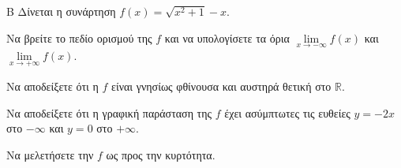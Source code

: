 \begin{thema}{Β}
Δίνεται η συνάρτηση $f(x) = \sqrt{x^2+1} - x$.
\begin{erwthma}
\item Να βρείτε το πεδίο ορισμού της $f$ και να υπολογίσετε τα όρια $\lim\limits_{x \to -\infty} f(x)$ και $\lim\limits_{x \to +\infty} f(x)$.
\item Να αποδείξετε ότι η $f$ είναι γνησίως φθίνουσα και αυστηρά θετική στο $\mathbb{R}$.
\item Να αποδείξετε ότι η γραφική παράσταση της $f$ έχει ασύμπτωτες τις ευθείες $y = -2x$ στο $-\infty$ και $y = 0$ στο $+\infty$.
\item Να μελετήσετε την $f$ ως προς την κυρτότητα.
\end{erwthma}
\end{thema}
